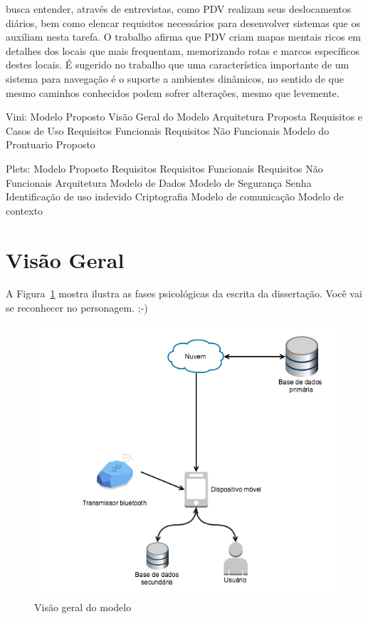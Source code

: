 \documentclass[english,brazilian]{UNISINOSmonografia}
\begin{document}
 busca entender, através de entrevistas, como PDV realizam seus deslocamentos diários, bem como elencar requisitos necessários para desenvolver sistemas que os auxiliam nesta tarefa. O trabalho afirma que PDV criam mapas mentais ricos em detalhes dos locais que mais frequentam, memorizando rotas e marcos específicos destes locais. É sugerido no trabalho que uma característica importante de um sistema para navegação é o suporte a ambientes dinâmicos, no sentido de que mesmo caminhos conhecidos podem sofrer alterações, mesmo que levemente.




Vini:
Modelo Proposto
	Visão Geral do Modelo
	Arquitetura Proposta
	Requisitos e Casos de Uso
		Requisitos Funcionais
		Requisitos Não Funcionais
	Modelo do Prontuario Proposto


Plets:
Modelo Proposto
	Requisitos
		Requisitos Funcionais
		Requisitos Não Funcionais
	Arquitetura
	Modelo de Dados
	Modelo de Segurança
		Senha
		Identificação de uso indevido
		Criptografia
	Modelo de comunicação
	Modelo de contexto


	\section{Visão Geral}

A Figura~\ref{fig:blablabla} mostra ilustra as fases psicológicas da escrita da dissertação. Você vai se reconhecer no personagem. ;-)

\FloatBarrier
\begin{figure}[!ht]
	\caption{Visão geral do modelo}
	\label{fig:blablabla}
	\centering%
	\begin{minipage}{.8\textwidth}
		\includegraphics[width=\textwidth]{imgs/visaoGeral}
	\end{minipage}
\end{figure}
\FloatBarrier
\end{document}
